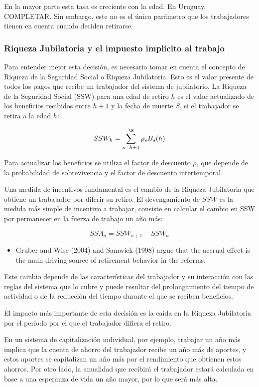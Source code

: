 \documentclass[]{article}
\providecommand{\tightlist}{%
  \setlength{\itemsep}{0pt}\setlength{\parskip}{0pt}}
\begin{document}
En la mayor parte esta tasa es creciente con la edad. En Uruguay,
COMPLETAR. Sin embargo, este no es el único parámetro que los
trabajadores tienen en cuenta cuando deciden retirarse.

\subsubsection{Riqueza Jubilatoria y el impuesto implícito al
trabajo}\label{riqueza-jubilatoria-y-el-impuesto-implicito-al-trabajo}

Para entender mejor esta decisión, es necesario tomar en cuenta el
concepto de Riqueza de la Seguridad Social o Riqueza Jubilatoria. Esto
es el valor presente de todos los pagos que recibe un trabajador del
sistema de jubilatorio. La Riqueza de la Seguridad Social (SSW) para una
edad de retiro \(h\) es el valor actualizado de los beneficios recibidos
entre \(h + 1\) y la fecha de muerte \(S\), si el trabajador se retira a
la edad \(h\):

\[ SSW_{h} = \sum_{s=h+1}^{\S} \rho_{s} B_{s}(h)\]

Para actualizar los beneficios se utiliza el factor de descuento
\(\rho\), que depende de la probabilidad de sobrevivencia y el factor de
descuento intertemporal.

Una medida de incentivos fundamental es el cambio de la Riqueza
Jubilatoria que obtiene un trabajador por diferir su retiro. El
devengamiento de \(SSW\) es la medida más simple de incentivo a
trabajar, consiste en calcular el cambio en SSW por permanecer en la
fuerza de trabajo un año más:

\[ SSA_{a} = SSW_{a+1} - SSW_{a}\]

\begin{itemize}
\tightlist
\item
  Gruber and Wise (2004) and Samwick (1998) argue that the accrual
  effect is the main driving source of retirement behavior in the
  reforms.
\end{itemize}

Este cambio depende de las características del trabajador y su
interacción con las reglas del sistema que lo cubre y puede resultar del
prolongamiento del tiempo de actividad o de la reducción del tiempo
durante el que se reciben beneficios.

El impacto más importante de esta decisión es la caída en la Riqueza
Jubilatoria por el período por el que el trabajador difiera el retiro.

En un sistema de capitalización individual, por ejemplo, trabajar un año
más implica que la cuenta de ahorro del trabajador recibe un año más de
aportes, y estos aportes se capitalizan un año más por el rendimiento
que obtienen estos ahorros. Por otro lado, la anualidad que recibirá el
trabajador estará calculada en base a una esperanza de vida un año
mayor, por lo que será más alta.
\end{document}

